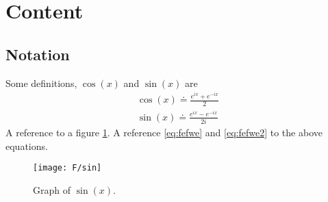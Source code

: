\section{Content}

\subsection{Notation}

\begin{Defn}
  \label{defn:1}
  Some definitions, $\cos(x)$ and \(\sin(x)\) are
  \begin{eqnarray}
    \cos(x) \doteq \frac{e^{ix}+e^{-ix}}{2}  \label{eq:fefwe} \\
    \sin(x) \doteq \frac{e^{ix}-e^{-ix}}{2i} \label{eq:fefwe2}
  \end{eqnarray}
  A reference to a figure \ref{fig:a354}.
  A reference \eqref{eq:fefwe} and  \eqref{eq:fefwe2} to the above equations.
\end{Defn}



\begin{figure}[ht]\label{fig:a354}
  \begin{center}
    \texttt{[image: F/sin]}
    \caption{Graph of \(\sin(x)\).}
  \end{center}
\end{figure}


\lipsum[2]


